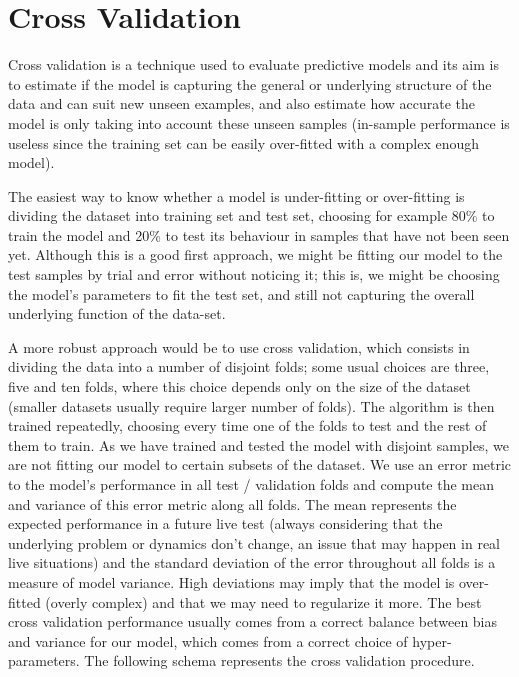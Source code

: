 \documentclass[a4paper,11pt,spanish]{report}
\begin{document}
\section{Cross Validation}
\label{sec:cv}

Cross validation is a technique used to evaluate predictive models and its aim is to estimate if the model is capturing the general or underlying structure of the data and can suit new unseen examples, and also estimate how accurate the model is only taking into account these unseen samples (in-sample performance is useless since the training set can be easily over-fitted with a complex enough model).

The easiest way to know whether a model is under-fitting or over-fitting is dividing the dataset into training set and test set, choosing for example 80\% to train the model and 20\% to test its behaviour in samples that have not been seen yet. Although this is a good first approach, we might be fitting our model to the test samples by trial and error without noticing it; this is, we might be choosing the model's parameters to fit the test set, and still not capturing the overall underlying function of the data-set.

A more robust approach would be to use cross validation, which consists in dividing the data into a number of disjoint folds; some usual choices are  three, five  and ten folds, where this choice depends only on the size of the dataset (smaller datasets usually require larger number of folds). The algorithm is then trained repeatedly, choosing every time one of the folds to test and the rest of them to train. As we have trained and tested the model with disjoint samples, we are not fitting our model to certain subsets of the dataset. We use an error metric to the model's performance in all test / validation folds and compute the mean and variance of this error metric along all folds. The mean represents the expected performance in a future live test (always considering that the underlying problem or dynamics don't change, an issue that may happen in real live situations) and the standard deviation of the error throughout all folds is a measure of model variance. High deviations may imply that the model is over-fitted (overly complex) and that we may need to regularize it more. The best cross validation performance usually comes from a correct balance between bias and variance for our model, which comes from a correct choice of hyper-parameters. The following schema represents the cross validation procedure.
\end{document}
